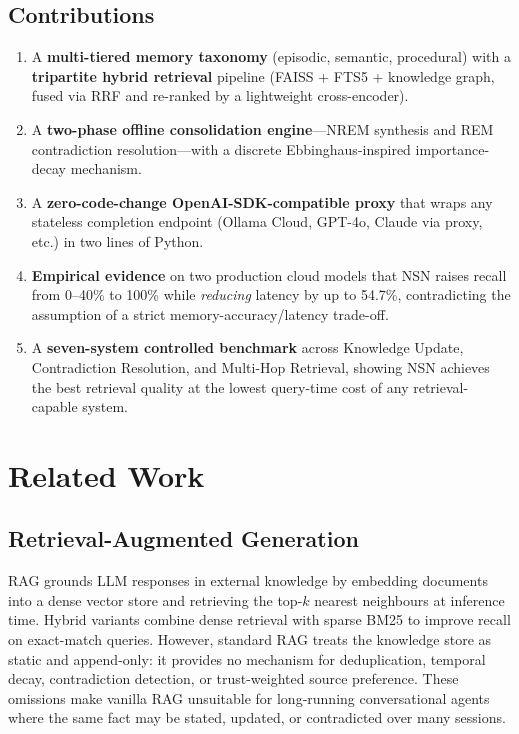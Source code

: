 \documentclass[conference]{IEEEtran}
\begin{document}
\subsection*{Contributions}
\begin{enumerate}
  \item A \textbf{multi-tiered memory taxonomy} (episodic, semantic,
        procedural) with a \textbf{tripartite hybrid retrieval} pipeline
        (FAISS + FTS5 + knowledge graph, fused via RRF and re-ranked by a
        lightweight cross-encoder).
  \item A \textbf{two-phase offline consolidation engine}---NREM synthesis
        and REM contradiction resolution---with a discrete Ebbinghaus-inspired
        importance-decay mechanism.
  \item A \textbf{zero-code-change OpenAI-SDK-compatible proxy} that wraps any
        stateless completion endpoint (Ollama Cloud, GPT-4o, Claude via proxy,
        etc.) in two lines of Python.
  \item \textbf{Empirical evidence} on two production cloud models that NSN
        raises recall from 0--40\% to 100\% while \emph{reducing} latency by up
        to 54.7\%, contradicting the assumption of a strict
        memory-accuracy/latency trade-off.
  \item A \textbf{seven-system controlled benchmark} across Knowledge Update,
        Contradiction Resolution, and Multi-Hop Retrieval, showing NSN achieves
        the best retrieval quality at the lowest query-time cost of any
        retrieval-capable system.
\end{enumerate}

\section{Related Work}\label{sec:related}

\subsection{Retrieval-Augmented Generation}
RAG \cite{lewis2020rag} grounds LLM responses in external knowledge by
embedding documents into a dense vector store and retrieving the top-$k$
nearest neighbours at inference time.  Hybrid variants combine dense retrieval
with sparse BM25 \cite{robertson2009bm25} to improve recall on exact-match
queries.  However, standard RAG treats the knowledge store as static and
append-only: it provides no mechanism for deduplication, temporal decay,
contradiction detection, or trust-weighted source preference.  These
omissions make vanilla RAG unsuitable for long-running conversational agents
where the same fact may be stated, updated, or contradicted over many sessions.
\end{document}
